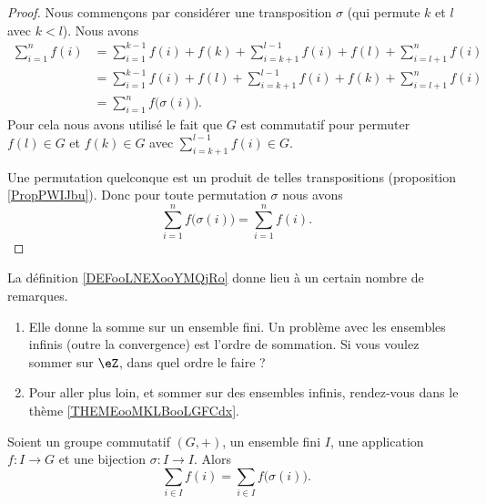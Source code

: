 \begin{proof}
	Nous commençons par considérer une transposition \( \sigma\) (qui permute \( k\) et \( l\) avec \( k<l\)). Nous avons
	\begin{subequations}
		\begin{align}
			\sum_{i=1}^nf(i) & =\sum_{i=1}^{k-1}f(i)+f(k)+\sum_{i=k+1}^{l-1}f(i)+f(l)+\sum_{i=l+1}^nf(i) \\
			                 & =\sum_{i=1}^{k-1}f(i)+f(l)+\sum_{i=k+1}^{l-1}f(i)+f(k)+\sum_{i=l+1}^nf(i) \\
			                 & =\sum_{i=1}^nf\big( \sigma(i) \big).
		\end{align}
	\end{subequations}
	Pour cela nous avons utilisé le fait que \( G\) est commutatif pour permuter \( f(l)\in G\) et \( f(k)\in G\) avec \( \sum_{i=k+1}^{l-1}f(i)\in G\).

	Une permutation quelconque est un produit de telles transpositions (proposition \ref{PropPWIJbu}). Donc pour toute permutation \( \sigma\) nous avons
	\begin{equation}
		\sum_{i=1}^nf\big( \sigma(i) \big)=\sum_{i=1}^nf(i).
	\end{equation}
\end{proof}

La définition \ref{DEFooLNEXooYMQjRo} donne lieu à un certain nombre de remarques.
\begin{enumerate}
	\item
	      Elle donne la somme sur un ensemble fini. Un problème avec les ensembles infinis (outre la convergence) est l'ordre de sommation. Si vous voulez sommer sur \( \eZ\), dans quel ordre le faire ?
	\item
        Pour aller plus loin, et sommer sur des ensembles infinis, rendez-vous dans le thème \ref{THEMEooMKLBooLGFCdx}.
\end{enumerate}

\begin{proposition}     \label{PROPooJBQVooNqWErk}
	Soient un groupe commutatif \( (G,+)\), un ensemble fini \( I\), une application \( f\colon I\to G\) et une bijection \( \sigma\colon I\to I\). Alors
	\begin{equation}
		\sum_{i\in I}f(i)=\sum_{i\in I}f\big( \sigma(i) \big).
	\end{equation}
\end{proposition}

